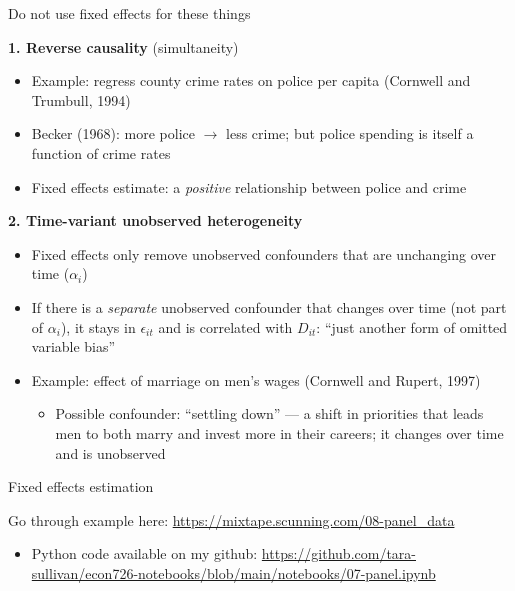 \documentclass[compress, 8pt]{beamer}
\begin{document}
\begin{frame}{Do not use fixed effects for these things}

\textbf{1. Reverse causality} (simultaneity)
\begin{itemize}
    \item Example: regress county crime rates on police per capita (Cornwell and Trumbull, 1994)
    \item Becker (1968): more police $\rightarrow$ less crime; but police spending is itself a function of crime rates
    \item Fixed effects estimate: a \emph{positive} relationship between police and crime
\end{itemize}

\vspace{2ex}
\textbf{2. Time-variant unobserved heterogeneity}
\begin{itemize}
    \item Fixed effects only remove unobserved confounders that are unchanging over time ($\alpha_i$)
    \item If there is a \emph{separate} unobserved confounder that changes over time (not part of $\alpha_i$), it stays in $\epsilon_{it}$ and is correlated with $D_{it}$: ``just another form of omitted variable bias''
    \item Example: effect of marriage on men's wages (Cornwell and Rupert, 1997)
    \begin{itemize}
        \item Possible confounder: ``settling down'' --- a shift in priorities that leads men to both marry and invest more in their careers; it changes over time and is unobserved
    \end{itemize}
\end{itemize}

\end{frame}
\begin{frame}{Fixed effects estimation}

Go through example here: \url{https://mixtape.scunning.com/08-panel_data}
\begin{itemize}
    \item Python code available on my github: \url{https://github.com/tara-sullivan/econ726-notebooks/blob/main/notebooks/07-panel.ipynb}
\end{itemize}

\end{frame}
\end{document}
